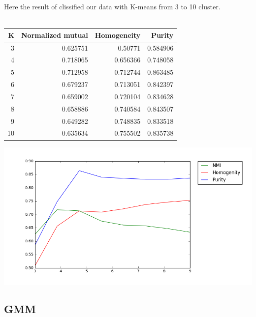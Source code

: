 \documentclass[11pt]{article}
\theoremstyle{plain}
\begin{document}
Here the result of clissified our data with K-means from 3 to 10 cluster.
\\
\\
\begin{center}
\begin{tabular}{|r |r |r |r |}

\hline
   K &   Normalized mutual &   Homogeneity &   Purity \\
\hline
   3 &            0.625751 &      0.50771  & 0.584906 \\
   4 &            0.718065 &      0.656366 & 0.748058 \\
   5 &            0.712958 &      0.712744 & 0.863485 \\
   6 &            0.679237 &      0.713051 & 0.842397 \\
   7 &            0.659002 &      0.720104 & 0.834628 \\
   8 &            0.658886 &      0.740584 & 0.843507 \\
   9 &            0.649282 &      0.748835 & 0.833518 \\
  10 &            0.635634 &      0.755502 & 0.835738 \\
\hline
\end{tabular}
 \end{center}
 
 
 
 \begin{center}
\includegraphics[scale=0.50]{2}
\end{center}
 
\subsection*{GMM}
 
\end{document}
